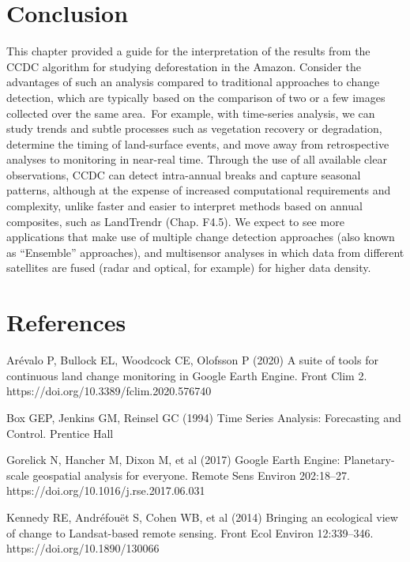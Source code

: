 \documentclass[
  letterpaper,
  DIV=11,
  numbers=noendperiod]{scrreprt}
\begin{document}
\hypertarget{conclusion-14}{%
\section*{Conclusion}\label{conclusion-14}}


This chapter provided a guide for the interpretation of the results from
the CCDC algorithm for studying deforestation in the Amazon. Consider
the advantages of such an analysis compared to traditional approaches to
change detection, which are typically based on the comparison of two or
a few images collected over the same area.~For example, with time-series
analysis, we can study trends and subtle processes such as vegetation
recovery or degradation, determine the timing of land-surface events,
and move away from retrospective analyses to monitoring in near-real
time. Through the use of all available clear observations, CCDC can
detect intra-annual breaks and capture seasonal patterns, although at
the expense of increased computational requirements and complexity,
unlike faster and easier to interpret methods based on annual
composites, such as LandTrendr (Chap. F4.5). We expect to see more
applications that make use of multiple change detection approaches (also
known as ``Ensemble'' approaches), and multisensor analyses in which
data from different satellites are fused (radar and optical, for
example) for higher data density.

\hypertarget{references-10}{%
\section*{References}\label{references-10}}


Arévalo P, Bullock EL, Woodcock CE, Olofsson P (2020) A suite of tools
for continuous land change monitoring in Google Earth Engine. Front Clim
2. https://doi.org/10.3389/fclim.2020.576740

Box GEP, Jenkins GM, Reinsel GC (1994) Time Series Analysis: Forecasting
and Control. Prentice Hall

Gorelick N, Hancher M, Dixon M, et al (2017) Google Earth Engine:
Planetary-scale geospatial analysis for everyone. Remote Sens Environ
202:18--27. https://doi.org/10.1016/j.rse.2017.06.031

Kennedy RE, Andréfouët S, Cohen WB, et al (2014) Bringing an ecological
view of change to Landsat-based remote sensing. Front Ecol Environ
12:339--346. https://doi.org/10.1890/130066
\end{document}
